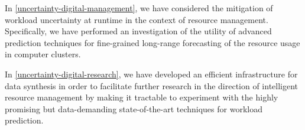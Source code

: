 In \cref{uncertainty-digital-management}, we have considered the mitigation of
workload uncertainty at runtime in the context of resource management.
Specifically, we have performed an investigation of the utility of advanced
prediction techniques for fine-grained long-range forecasting of the resource
usage in computer clusters.

In \cref{uncertainty-digital-research}, we have developed an efficient
infrastructure for data synthesis in order to facilitate further research in the
direction of intelligent resource management by making it tractable to
experiment with the highly promising but data-demanding state-of-the-art
techniques for workload prediction.
